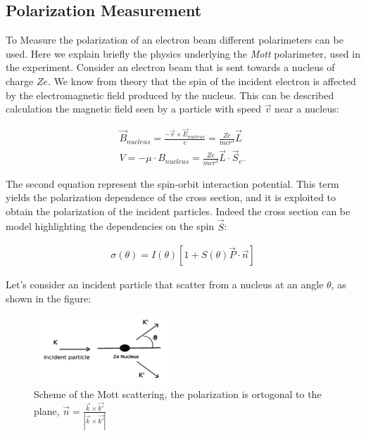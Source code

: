 \subsection{Polarization Measurement}

To Measure the polarization of an electron beam different polarimeters can be used. Here we explain briefly the physics underlying the \textit{Mott} polarimeter, used in the experiment.
Consider an electron beam that is sent towards a nucleus of charge $Ze$. We know from theory \cite{MottElectron} that the spin of the incident electron is affected by the electromagnetic field produced by the nucleus. This can be described calculation the magnetic field seen by a particle with speed $\vec{v}$ near a nucleus:

\begin{align*}
\vec{B}_{nucleus} = \frac{-\vec{v} \times \vec{E}_{nucleus}}{c}  = \frac{Ze}{mc r^{3}} \vec{L} \\
V = - \mu \cdot B_{nucleus} = \frac{Ze}{mcr^{3}} \vec{L} \cdot \vec{S}_{e^{-}}
\end{align*}

The second equation represent the spin-orbit interaction potential. This term yields the polarization dependence of the cross section, and it is exploited to obtain the polarization of the incident particles. Indeed the cross section can be model highlighting the dependencies on the spin $\vec{S}$:

\begin{align*}
\sigma(\theta) = I(\theta) [1 + S(\theta) \vec{P} \cdot \vec{n} ]
\end{align*}

Let's consider an incident particle that scatter from a nucleus at an angle $\theta$, as shown in the figure:

\begin{figure}[hbtp]
\centering
\includegraphics[width = 0.45\textwidth]{ExperimentalSetup/mottFig.png}
\caption{Scheme of the Mott scattering, the polarization is ortogonal to the plane,  $ \vec{n} = \frac{\vec{k} \times \vec{k'}}{|\vec{k} \times \vec{k'}|}$}
\end{figure}

